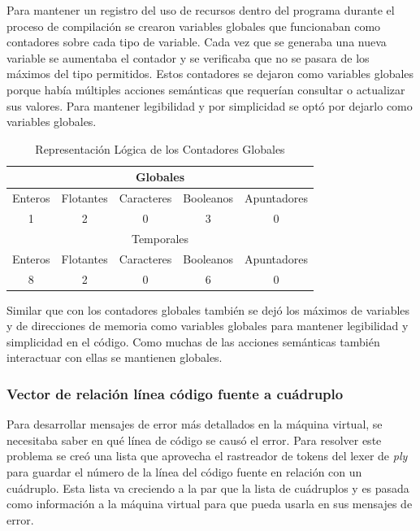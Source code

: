 Para mantener un registro del uso de recursos dentro del programa durante el proceso de compilación se crearon variables globales que funcionaban como contadores sobre cada tipo de variable. Cada vez que se generaba una nueva variable se aumentaba el contador y se verificaba que no se pasara de los máximos del tipo permitidos. Estos contadores se dejaron como variables globales porque había múltiples acciones semánticas que requerían consultar o actualizar sus valores. Para mantener legibilidad y por simplicidad se optó por dejarlo como variables globales.

\begin{table}[htbp]
    \centering
    \begin{tabular}{c|c|c|c|c}
        \multicolumn{5}{c}{Globales} \\\hline
         Enteros & Flotantes & Caracteres & Booleanos & Apuntadores  \\
          1 & 2 & 0 & 3 & 0 \\\hline\hline
          
          \multicolumn{5}{c}{Temporales} \\
         Enteros & Flotantes & Caracteres & Booleanos & Apuntadores  \\
          8 & 2 & 0 & 6 & 0 
    \end{tabular}
    \caption{Representación Lógica de los Contadores Globales}
    \label{tab:my_label}
\end{table}
\FloatBarrier
Similar que con los contadores globales también se dejó los máximos de variables y de direcciones de memoria como variables globales para mantener legibilidad y simplicidad en el código. Como muchas de las acciones semánticas también interactuar con ellas se mantienen globales.

\subsubsection{Vector de relación línea código fuente a cuádruplo}

Para desarrollar mensajes de error más detallados en la máquina virtual, se necesitaba saber en qué línea de código se causó el error. Para resolver este problema se creó una lista que aprovecha el rastreador de tokens del lexer de \emph{ply} para guardar el número de la línea del código fuente en relación con un cuádruplo. Esta lista va creciendo a la par que la lista de cuádruplos y es pasada como información a la máquina virtual para que pueda usarla en sus mensajes de error.


